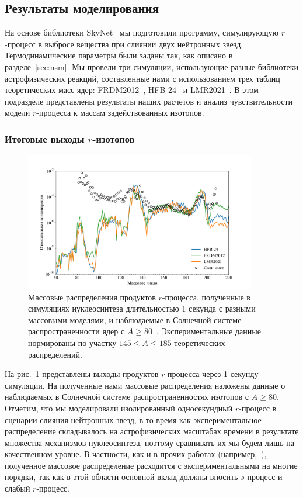 \subsection{Результаты моделирования}
На основе библиотеки SkyNet~\cite{lippuner2017} мы подготовили программу, симулирующую $r$-процесс в выбросе вещества при слиянии двух нейтронных звезд. Термодинамические параметры были заданы так, как описано в разделе~\ref{sec:nsm}. Мы провели три симуляции, использующие разные библиотеки астрофизических реакций, составленные нами с использованием трех таблиц теоретических масс ядер: FRDM2012~\cite{moller2016}, HFB-24~\cite{goriely2013} и LMR2021~\cite{vladimirova2022}. В этом подразделе представлены результаты наших расчетов и анализ чувствительности модели $r$-процесса к массам задействованных изотопов.

\subsubsection{Итоговые выходы $r$-изотопов}

\begin{figure}
\centering
\includegraphics[width=0.9\textwidth]{pics/distr.pdf}
\caption{Массовые распределения продуктов $r$-процесса, полученные в симуляциях нуклеосинтеза длительностью 1 секунда с разными массовыми моделями, и наблюдаемые в Солнечной системе распространенности ядер с $A \geq 80$~\cite{lodders2003}. Экспериментальные данные нормированы по участку $145 \leq A \leq 185$ теоретических распределений.}
\label{fig:distr}
\end{figure}

На рис.~\ref{fig:distr} представлены выходы продуктов $r$-процесса через 1 секунду симуляции. На полученные нами массовые распределения наложены данные о наблюдаемых в Солнечной системе распространенностях изотопов с $A \geq 80$. Отметим, что мы моделировали изолированный односекундный $r$-процесс в сценарии слияния нейтронных звезд, в то время как экспериментальное распределение складывалось на астрофизических масштабах времени в результате множества механизмов нуклеосинтеза, поэтому сравнивать их мы будем лишь на качественном уровне. В частности, как и в прочих работах (например,~\cite{goriely2011}), полученное массовое распределение расходится с экспериментальными на многие порядки, так как в этой области основной вклад должны вносить $s$-процесс и слабый $r$-процесс.

